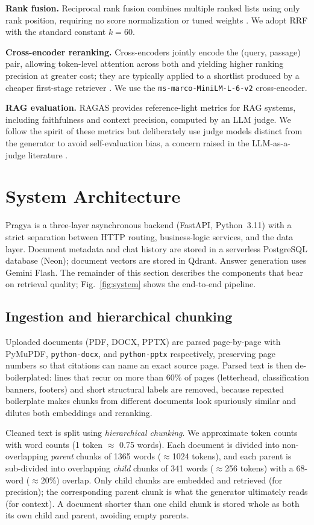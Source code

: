 \documentclass[conference]{IEEEtran}
\begin{document}
\textbf{Rank fusion.} Reciprocal rank fusion combines multiple ranked lists using
only rank position, requiring no score normalization or tuned weights
\cite{cormack2009reciprocal}.
We adopt RRF with the standard constant $k=60$.

\textbf{Cross-encoder reranking.} Cross-encoders jointly encode the (query,
passage) pair, allowing token-level attention across both and yielding higher
ranking precision at greater cost; they are typically applied to a shortlist
produced by a cheaper first-stage retriever \cite{nogueira2019passage}.
We use the \texttt{ms-marco-MiniLM-L-6-v2} cross-encoder.

\textbf{RAG evaluation.} RAGAS \cite{es2024ragas} provides reference-light metrics
for RAG systems, including faithfulness and context precision, computed by an
LLM judge.
We follow the spirit of these metrics but deliberately use judge models distinct
from the generator to avoid self-evaluation bias, a concern raised in the
LLM-as-a-judge literature \cite{zheng2023judging}.

\section{System Architecture}
Pragya is a three-layer asynchronous backend (FastAPI, Python~3.11) with a strict
separation between HTTP routing, business-logic services, and the data layer.
Document metadata and chat history are stored in a serverless PostgreSQL database
(Neon); document vectors are stored in Qdrant. Answer generation uses Gemini
Flash. The remainder of this section describes the components that bear on
retrieval quality; Fig.~\ref{fig:system} shows the end-to-end pipeline.

\subsection{Ingestion and hierarchical chunking}
Uploaded documents (PDF, DOCX, PPTX) are parsed page-by-page with PyMuPDF,
\texttt{python-docx}, and \texttt{python-pptx} respectively, preserving page
numbers so that citations can name an exact source page. Parsed text is then
de-boilerplated: lines that recur on more than 60\% of pages (letterhead,
classification banners, footers) and short structural labels are removed, because
repeated boilerplate makes chunks from different documents look spuriously
similar and dilutes both embeddings and reranking.

Cleaned text is split using \emph{hierarchical chunking}. We approximate token
counts with word counts (1 token $\approx$ 0.75 words). Each document is divided
into non-overlapping \emph{parent} chunks of 1365 words ($\approx$1024 tokens),
and each parent is sub-divided into overlapping \emph{child} chunks of 341 words
($\approx$256 tokens) with a 68-word ($\approx$20\%) overlap. Only child chunks
are embedded and retrieved (for precision); the corresponding parent chunk is
what the generator ultimately reads (for context). A document shorter than one
child chunk is stored whole as both its own child and parent, avoiding empty
parents.
\end{document}
